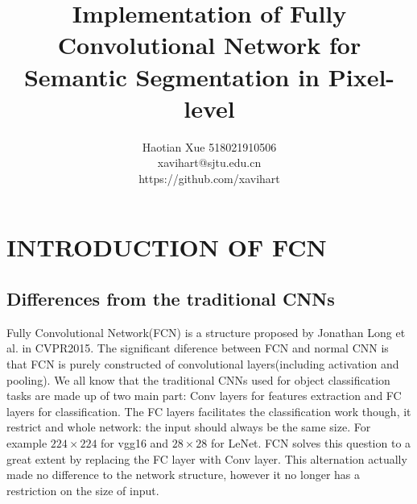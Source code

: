 \documentclass[transmag]{IEEEtran}
\begin{document}
\title{Implementation of Fully Convolutional Network for Semantic Segmentation in Pixel-level}

\author{Haotian Xue 518021910506\\
xavihart@sjtu.edu.cn   \\ https://github.com/xavihart}



\maketitle

\section{INTRODUCTION OF FCN}
\subsection{Differences from the traditional CNNs}
  Fully Convolutional Network(FCN)\cite{1} is a structure proposed by Jonathan Long et al. in CVPR2015. The significant diference between FCN and 
  normal CNN is that FCN is purely constructed of convolutional layers(including activation and pooling). We all know that the traditional CNNs used 
  for object classification tasks are made up of two main part: Conv layers for features extraction and FC layers for classification. The FC layers 
  facilitates the classification work though, it restrict and whole network: the input should always be the same size. For example $224 \times 224$ for 
  vgg16 and $28 \times 28$ for LeNet. FCN solves this question to a great extent by replacing the FC layer with Conv layer. This alternation actually made 
  no difference to the network structure, however it no longer has a restriction on the size of input. 
  
\end{document}
